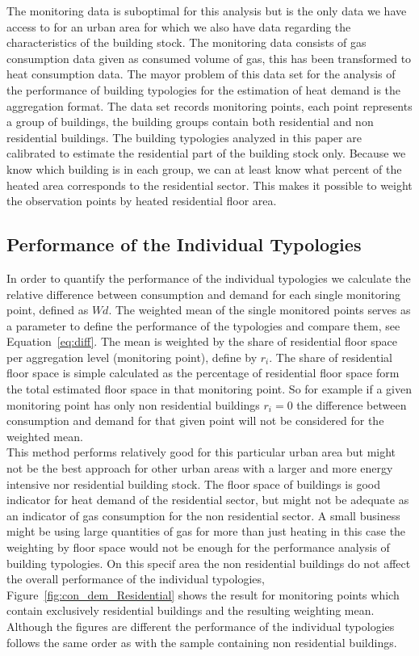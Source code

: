 \documentclass[authoryear,preprint,review,12pt]{elsarticle}
\begin{document}
\begin{linenumbers}
The monitoring data is suboptimal for this analysis but is the only data we
have access to for an urban area for which we also have data regarding the
characteristics of the building stock. The monitoring data consists of gas
consumption data given as consumed volume of gas, this has been transformed to
heat consumption data. The mayor problem of this data set for the analysis of
the performance of building typologies for the estimation of heat demand is the
aggregation format. The data set records monitoring points, each point
represents a group of buildings, the building groups contain both residential
and non residential buildings. The building typologies analyzed in this paper
are calibrated to estimate the residential part of the building stock only.
Because we know which building is in each group, we can at least know what
percent of the heated area corresponds to the residential sector. This makes it
possible to weight the observation points by heated residential floor area.\\

\subsection{Performance of the Individual Typologies}

In order to quantify the performance of the individual typologies we calculate
the relative difference between consumption and demand for each single
monitoring point, defined as $Wd$.  The weighted mean of the single monitored
points serves as a parameter to define the performance of the typologies and
compare them, see Equation~\ref{eq:diff}.  The mean is weighted by the share of
residential floor space per aggregation level (monitoring point), define by
$r_i$. The share of residential floor space is simple calculated as the
percentage of residential floor space form the total estimated floor space in
that monitoring point.  So for example if a given monitoring point has only non
residential buildings $r_i = 0$ the difference between consumption and demand
for that given point will not be considered for the weighted mean.\\

This method performs relatively good for this particular urban area but might
not be the best approach for other urban areas with a larger and more energy
intensive nor residential building stock. The floor space of buildings is good
indicator for heat demand of the residential sector, but might not be adequate
as an indicator of gas consumption for the non residential sector. A small
business might be using large quantities of gas for more than just heating in
this case the weighting by floor space would not be enough for the performance
analysis of building typologies. On this specif area the non residential
buildings do not affect the overall performance of the individual typologies,
Figure~\ref{fig:con_dem_Residential} shows the result for monitoring points
which contain exclusively residential buildings and the resulting weighting
mean. Although the figures are different the performance of the individual
typologies follows the same order as with the sample containing non residential
buildings.\\ 


\end{linenumbers}
\end{document}
